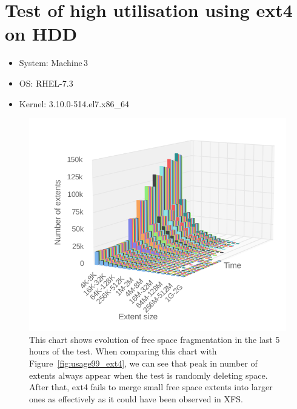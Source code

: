 \documentclass[
  color, %
  table, %
  lof,   %
  lot,   %
]{fithesis3}
\begin{document}
\section{Test of high utilisation using ext4 on HDD}
\begin{itemize}
\itemsep0em 
   \item System: Machine\,3
   \item OS: RHEL-7.3
   \item Kernel: 3.10.0-514.el7.x86\_64
\end{itemize}

\begin{figure}[h]
    \centering
    \includegraphics[width=\textwidth,keepaspectratio]{../charts/HDD_ext4/free.png}
    \caption[Evolution of free space fragmentation of ext4 during testing of high utilisation of HDD]{This chart shows evolution of free space fragmentation in the last 5 hours of the test. When comparing this chart with Figure~\ref{fig:usage99_ext4}, we can see that peak in number of extents always appear when the test is randomly deleting space. After that, ext4 fails to merge small free space extents into larger ones as effectively as it could have been observed in XFS.}
    \label{fig:free99_ext4}
\end{figure}
\end{document}
